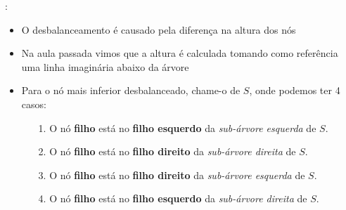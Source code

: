 \begin{frame}{\secname : \subsecname}
  \begin{itemize}
  \item O desbalanceamento é causado pela diferença na altura dos nós
  \item Na aula passada vimos que a altura é calculada tomando como referência uma linha imaginária abaixo da árvore
  \item Para o nó mais inferior desbalanceado, chame-o de $S$, onde podemos ter 4 casos:
    \begin{itemize}
      \item[1.] O nó \textbf{filho} está no \textbf{filho esquerdo} da \emph{sub-árvore esquerda} de $S$.
      \item[2.] O nó \textbf{filho} está no \textbf{filho direito} da \emph{sub-árvore direita} de $S$.
      \item[3.] O nó \textbf{filho} está no \textbf{filho direito} da \emph{sub-árvore esquerda} de $S$. 
      \item[4.] O nó \textbf{filho} está no \textbf{filho esquerdo} da \emph{sub-árvore direita} de $S$. 
    \end{itemize}
  \end{itemize}
\end{frame}







